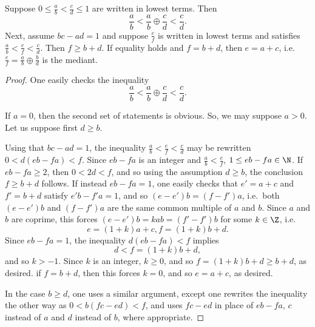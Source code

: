 \documentclass[12pt]{article}
\begin{document}
\begin{prop}Suppose $0 \leq \frac ab < \frac cd \leq 1$ are written in lowest terms. Then
\[\frac ab < \frac{a}{b}\oplus \frac{c}{d} < \frac{c}{d}.\] Next, assume $bc-ad = 1$ and suppose $\frac ef$ is written in lowest terms and satisfies $\frac ab < \frac ef < \frac cd$. Then $f \geq b+d$. If equality holds and $f = b+d$, then $e = a+c$, i.e. $\frac{e}{f} = \frac ab \oplus \frac bd$ is the mediant. \end{prop}
\begin{proof}
One easily checks the inequality
\[\frac{a}{b} < \frac{a}{b}\oplus \frac{c}{d} < \frac{c}{d}.\]

If $a = 0$, then the second set of statements is obvious. So, we may suppose $a > 0$. Let us suppose first $d \geq b$.

Using that $bc-ad = 1$, the inequality $\frac ab < \frac ef < \frac cd$ may be rewritten $0 < d(eb-fa) < f$. Since $eb-fa$ is an integer and $\frac{a}{b} < \frac{e}{f}$, $1 \leq eb-fa \in \N$. If $eb-fa \geq 2$, then $0 < 2d < f$, and so using the assumption $d \geq b$, the conclusion $f \geq b+d$ follows. If instead $eb-fa = 1$, one easily checks that $e' = a+c$ and $f' = b+d$ satisfy $e'b-f'a = 1$, and so $(e-e')b = (f-f')a$, i.e.\ both $(e-e')b$ and $(f-f')a$ are the same common multiple of $a$ and $b$. Since $a$ and $b$ are coprime, this forces $(e-e')b = kab = (f'-f')b$ for some $k \in \Z$, i.e.\
\[e = (1+k)a + c, f = (1+k)b + d.\] Since $eb-fa = 1$, the inequality $d(eb-fa) < f$ implies
\[d < f = (1+k)b + d,\] and so $k > -1$. Since $k$ is an integer, $k \geq 0$, and so $f = (1+k)b + d \geq b+d$, as desired. if $f = b+d$, then this forces $k = 0$, and so $e = a+c$, as desired.

In the case $b \geq d$, one uses a similar argument, except one rewrites the inequality the other way as $0 < b(fc-ed) < f$, and uses $fc-ed$ in place of $eb-fa$, $c$ instead of $a$ and $d$ instead of $b$, where appropriate.\end{proof}
\end{document}
